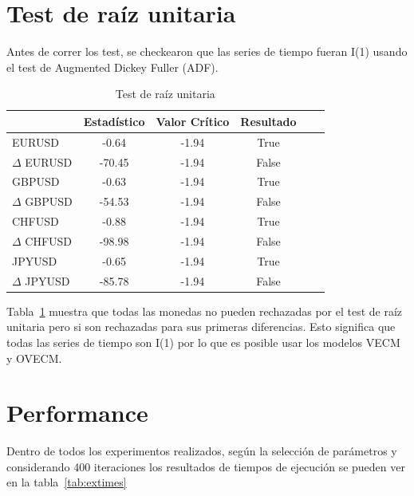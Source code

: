 \section{Test de raíz unitaria}
Antes de correr los test, se checkearon que las series de tiempo fueran
I(1) usando el test de Augmented Dickey Fuller (ADF).

\begin{table}[h!]
\caption{Test de raíz unitaria}
\label{tab:adf}
\begin{center}
\begin{tabular}{|l|c|c|c|c|c|}
\hline
& \textbf{Estadístico} & \textbf{Valor Crítico} & \textbf{Resultado}\\
\hline
EURUSD          & -0.64 & -1.94 & True       \\
$\Delta$ EURUSD & -70.45   & -1.94 & False       \\
GBPUSD          & -0.63   & -1.94 & True          \\
$\Delta$ GBPUSD & -54.53   & -1.94 & False       \\
CHFUSD          & -0.88   & -1.94 & True         \\
$\Delta$ CHFUSD & -98.98   & -1.94 & False       \\
JPYUSD          & -0.65 & -1.94 & True        \\
$\Delta$ JPYUSD & -85.78 & -1.94 & False     \\ 
\hline
\end{tabular}
\end{center}
\end{table}

Tabla~\ref{tab:adf} muestra que todas las monedas no pueden rechazadas por el test
de raíz unitaria pero si son rechazadas para sus primeras diferencias. Esto significa
que todas las series de tiempo son I(1) por lo que es posible usar los modelos VECM
y OVECM.

\section{Performance}
Dentro de todos los experimentos realizados, según la selección de parámetros
y considerando 400 iteraciones los resultados de tiempos de ejecución se pueden
ver en la tabla~\ref{tab:extimes}

